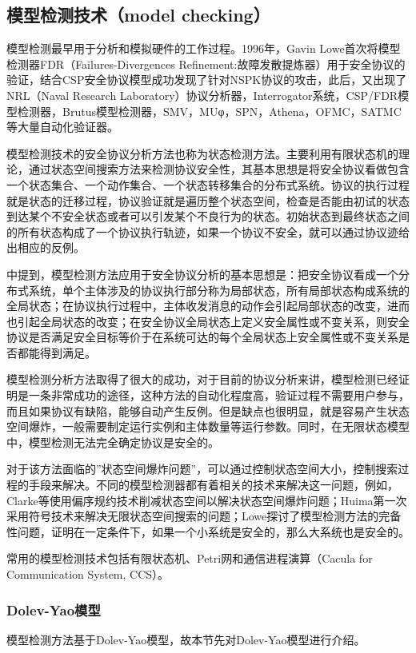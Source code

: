 \documentclass[cs4size,a4pape,UTF8]{ctexart}
\numberwithin{equation}{section}
\numberwithin{table}{section}
\numberwithin{figure}{section}
\begin{document}
\subsection{模型检测技术（model checking）}

模型检测最早用于分析和模拟硬件的工作过程。1996年，Gavin Lowe首次将模型检测器FDR（Failures-Divergences Refinement:故障发散提炼器）用于安全协议的验证，结合CSP安全协议模型成功发现了针对NSPK协议的攻击，此后，又出现了NRL（Naval Research Laboratory）协议分析器，Interrogator系统，CSP/FDR模型检测器，Brutus模型检测器，SMV，MUφ，SPN，Athena，OFMC，SATMC等大量自动化验证器\cite{1}\cite{5}\cite{6}。

模型检测技术的安全协议分析方法也称为状态检测方法。主要利用有限状态机的理论，通过状态空间搜索方法来检测协议安全性，其基本思想是将安全协议看做包含一个状态集合、一个动作集合、一个状态转移集合的分布式系统。协议的执行过程就是状态的迁移过程，协议验证就是遍历整个状态空间，检查是否能由初试的状态到达某个不安全状态或者可以引发某个不良行为的状态。初始状态到最终状态之间的所有状态构成了一个协议执行轨迹，如果一个协议不安全，就可以通过协议迹给出相应的反例\cite{2}\cite{6}。

\cite{book}中提到，模型检测方法应用于安全协议分析的基本思想是：把安全协议看成一个分布式系统，单个主体涉及的协议执行部分称为局部状态，所有局部状态构成系统的全局状态；在协议执行过程中，主体收发消息的动作会引起局部状态的改变，进而也引起全局状态的改变；在安全协议全局状态上定义安全属性或不变关系，则安全协议是否满足安全目标等价于在系统可达的每个全局状态上安全属性或不变关系是否都能得到满足。

模型检测分析方法取得了很大的成功，对于目前的协议分析来讲，模型检测已经证明是一条非常成功的途径，这种方法的自动化程度高，验证过程不需要用户参与，而且如果协议有缺陷，能够自动产生反例。但是缺点也很明显，就是容易产生状态空间爆炸，一般需要制定运行实例和主体数量等运行参数。同时，在无限状态模型中，模型检测无法完全确定协议是安全的\cite{1}。

对于该方法面临的''状态空间爆炸问题''，可以通过控制状态空间大小，控制搜索过程的手段来解决。不同的模型检测器都有着相关的技术来解决这一问题，例如，Clarke等使用偏序规约技术削减状态空间以解决状态空间爆炸问题；Huima第一次采用符号技术来解决无限状态空间搜索的问题；Lowe探讨了模型检测方法的完备性问题，证明在一定条件下，如果一个小系统是安全的，那么大系统也是安全的。

常用的模型检测技术包括有限状态机、Petri网和通信进程演算（Cacula for Communication System, CCS）。

\subsubsection{Dolev-Yao模型}
模型检测方法基于Dolev-Yao模型，故本节先对Dolev-Yao模型进行介绍。
\end{document}
